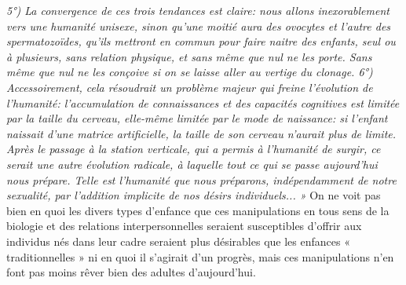  \emph{5°) La convergence de ces trois tendances est claire: nous allons inexorablement vers une humanité unisexe, sinon qu'une moitié aura des ovocytes et l'autre des spermatozoïdes, qu'ils mettront en commun pour faire naitre des enfants, seul ou à plusieurs, sans relation physique, et sans même que nul ne les porte. Sans même que nul ne les conçoive si on se laisse aller au vertige du clonage.
 6°) Accessoirement, cela résoudrait un problème majeur qui freine l'évolution de l'humanité: l'accumulation de connaissances et des capacités cognitives est limitée par la taille du cerveau, elle-même limitée par le mode de naissance: si l'enfant naissait d'une matrice artificielle, la taille de son cerveau n'aurait plus de limite. Après le passage à la station verticale, qui a permis à l'humanité de surgir, ce serait une autre évolution radicale, à laquelle tout ce qui se passe aujourd'hui nous prépare. Telle est l'humanité que nous préparons, indépendamment de notre sexualité, par l'addition implicite de nos désirs individuels... » 
}
 On ne voit pas bien en quoi les divers types d'enfance que ces manipulations en tous sens de la biologie et des relations interpersonnelles seraient susceptibles d'offrir aux individus nés dans leur cadre seraient plus désirables que les enfances « traditionnelles » ni en quoi il s'agirait d'un progrès, mais ces manipulations n'en font pas moins rêver bien des adultes d'aujourd'hui.
 
